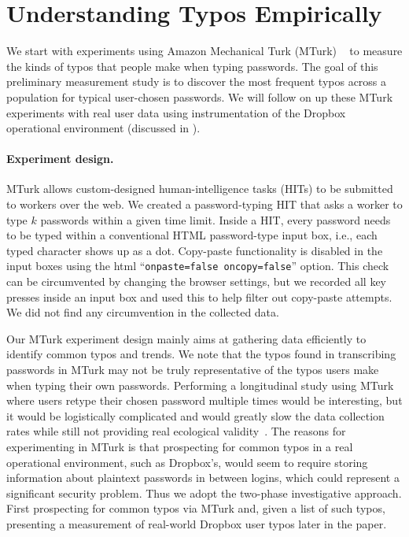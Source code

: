 \section{Understanding Typos Empirically}
\label{sec:mturk}
\def\shift{\ensuremath{\langle s \rangle}}
\def\caps{\ensuremath{\langle c \rangle}}



We start with experiments using Amazon Mechanical Turk (MTurk) ~\cite{buhrmester2011amazon} to
measure the kinds of typos that people make when typing passwords.
The goal of this preliminary measurement study is to discover the most
frequent typos across a population for typical user-chosen
passwords. We will follow on up these MTurk experiments with real user
data using instrumentation of the Dropbox operational environment
(discussed in ).

\paragraph{Experiment design.} 
MTurk allows custom-designed human-intelligence tasks (HITs) to be
submitted to workers over the
web. %
We created a password-typing HIT that asks a worker to type $k$
passwords within a given time limit. Inside a HIT, every password
needs to be typed within a conventional HTML password-type input box,
i.e., each typed character shows up as a dot. Copy-paste functionality
is disabled in the input boxes using the html ``{\tt onpaste=false
  oncopy=false}'' option. This check can be circumvented by changing
the browser settings, but we recorded all key presses inside an input
box and used this to help filter out copy-paste attempts. We did not
find any circumvention in the collected data.

Our MTurk experiment design mainly aims at gathering data efficiently to
identify common typos and trends. We note that the typos found in transcribing
passwords in MTurk may not be truly representative of the typos users make when
typing their own passwords. Performing a longitudinal study using MTurk where
users retype their chosen password multiple times would be interesting, but it
would be logistically complicated and would greatly slow the data collection
rates while still not providing real ecological validity~\cite{fahl2013ecological}. The reasons for
experimenting in MTurk is that prospecting for common typos in a real
operational environment, such as Dropbox's, would seem to require 
storing information about plaintext passwords in between logins, which could
represent a significant security problem.
Thus we adopt the two-phase investigative approach. First prospecting for common
typos via MTurk and, given a list of such typos, presenting a measurement
of real-world Dropbox user typos later in the paper.

